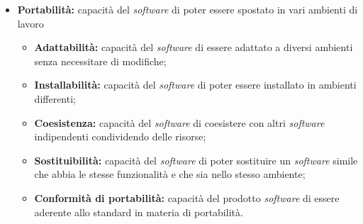 \begin{itemize}
	\item \textbf{Portabilità:} capacità del \textit{software} di poter essere 
	spostato in vari ambienti di lavoro
	\begin{itemize}
		\item \textbf{Adattabilità:} capacità del \textit{software} di essere 
		adattato a diversi ambienti senza necessitare di modifiche;
		\item \textbf{Installabilità:} capacità del \textit{software} di poter 
		essere installato in ambienti differenti;
		\item \textbf{Coesistenza:} capacità del \textit{software} di 
		coesistere con altri \textit{software} indipendenti condividendo delle 
		risorse;
		\item \textbf{Sostituibilità:} capacità del \textit{software} di poter 
		sostituire un \textit{software} simile che abbia le stesse funzionalità 
		e che sia nello stesso ambiente;
		\item \textbf{Conformità di portabilità:} capacità del prodotto 
		\textit{software} di essere aderente allo standard in materia di 
		portabilità.
	\end{itemize}
	
\end{itemize}